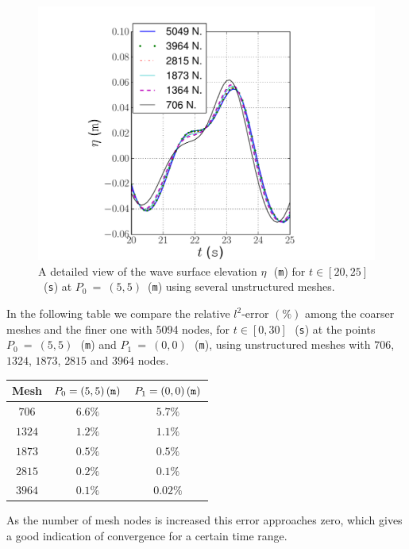 \begin{figure}
{\centering
\includegraphics[width=\largefig]{chapters/lopes/pdf/detail_unstr.pdf}
\caption{A detailed view   of the wave surface elevation $\eta$\,~({\tt m})
for $t\in[20,25]$~({\tt s}) at
$P_0~=~(5,5)$~({\tt m}) using several unstructured meshes.}\par}
\label{fig:lopes:unstdetail}
\end{figure}

In the following table we compare the relative $l^2$-error $(\%)$ among the coarser
meshes and the finer one with 5094 nodes,
for $t\in[0,30]$\,~({\tt s}) at the points
$P_0~=~(5,5)$\,~({\tt m}) and $P_1~=~(0,0)$\,~({\tt m}),  using
unstructured meshes with $706$, $1324$, $1873$, $2815$ and $3964$ nodes.
\smallskip
\begin{center}
\renewcommand{\arraystretch}{1.3}
\begin{tabular}{|c|c|c|}
\hline Mesh & $P_0=(5,5)\,({\tt m})$ & $P_1=(0,0)\,({\tt m})$\\ \hline
$706$ &$6.6\%$ & $5.7\%$ \\
\hline $1324$  &$1.2\%$    &$1.1\%$ \\
\hline  $1873$ & $0.5\%$   & $0.5\%$ \\
\hline $2815$ & $0.2\%$  &$0.1\%$  \\
\hline $3964$ & $0.1\%$    &$0.02\%$\\ \hline
\end{tabular}
\end{center}
\smallskip
As the number  of mesh nodes is increased this error
approaches zero, which gives a good indication of convergence
for a certain time range.

